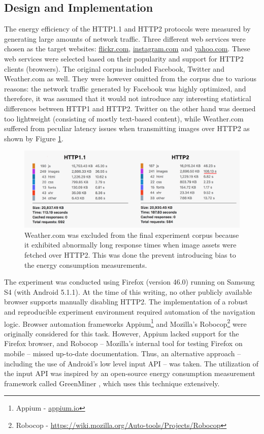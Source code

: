 \documentclass{article}
\begin{document}
\subsection{Design and Implementation}
\label{chapter:design-implementation}

The energy efficiency of the HTTP1.1 and HTTP2 protocols were measured by generating large amounts of network traffic. Three different web services were chosen as the target websites: \url{flickr.com}, \url{instagram.com} and \url{yahoo.com}. These web services were selected based on their popularity and support for HTTP2 clients (browsers). The original corpus included Facebook, Twitter and Weather.com as well. They were  however omitted from the corpus due to various reasons: the network traffic generated by Facebook was highly optimized, and therefore, it was assumed that it would not introduce any interesting statistical differences between HTTP1 and HTTP2. Twitter on the other hand was deemed too lightweight (consisting of mostly text-based content), while Weather.com suffered from peculiar latency issues when transmitting images over HTTP2 as shown by Figure \ref{fig:weather.com}.

\begin{figure}[h!]
\centering
\includegraphics[width=\linewidth]{images/weathercom.png}
\caption{Weather.com was excluded from the final experiment corpus because it exhibited abnormally long response times when image assets were fetched over HTTP2. This was done the prevent introducing bias to the energy consumption measurements.}
\label{fig:weather.com}
\end{figure}

The experiment was conducted using Firefox (version 46.0) running on Samsung S4 (with Android 5.1.1). At the time of this writing, no other publicly available browser supports manually disabling HTTP2. The implementation of a robust and reproducible experiment environment required automation of the navigation logic. Browser automation frameworks Appium\footnote{Appium - \url{appium.io}} and Mozilla’s Robocop\footnote{Robocop - \url{https://wiki.mozilla.org/Auto-tools/Projects/Robocop}} were originally considered for this task. However, Appium lacked support for the Firefox browser, and Robocop -- Mozilla’s internal tool for testing Firefox on mobile -- missed up-to-date documentation. Thus, an alternative approach -- including the use of Android’s low level input API -- was taken. The utilization of the input API was inspired by an open-source energy consumption measurement framework called GreenMiner \citep{greenminer}, which uses this technique extensively.
\end{document}
